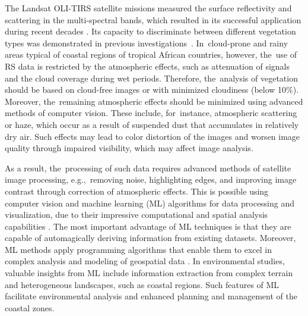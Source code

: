 \documentclass[coasts,article,accept,pdftex,oneauthor]{Definitions/mdpi}
\begin{document}
The Landsat OLI-TIRS satellite missions measured the surface reflectivity and scattering in the multi-spectral bands, {which resulted in its successful application during recent decades} \cite{WULDER2022113195}. Its capacity to discriminate between different vegetation types was demonstrated in previous investigations~\cite{Ferreira,Montfort,Fatoyinbo,Ribeiro}. In~cloud-prone and rainy areas typical of coastal regions of tropical African countries, however, the~use of RS data is restricted by the atmospheric effects, such as attenuation of signals and the cloud coverage during wet periods. {Therefore, the~analysis of vegetation should be based on cloud-free images or with minimized cloudiness (below 10}\%). {Moreover, the~remaining atmospheric effects should be minimized using advanced methods of computer vision. These include, for~instance, atmospheric scattering or haze, which occur as a result of suspended dust that accumulates in relatively dry air. Such effects may lead to color distortion of the images and worsen image quality through impaired visibility, which may affect image analysis. }

As a result, the~processing of such data{ }requires advanced methods of satellite image processing{, e.g.,~removing noise, highlighting edges, and improving image contrast through correction of atmospheric effects. This is possible using} computer vision and machine learning {(ML) } algorithms for data processing and visualization, {due to their impressive computational and spatial analysis capabilities }\cite{LI2023104653,PHAM2023104501,HAN202387}. {The most important advantage of ML techniques is that they are capable of automagically deriving information from  existing datasets. Moreover, ML methods apply programming algorithms that enable them to excel in complex analysis and modeling of geospatial data} \cite{KHAN2022101678}. {In environmental studies, valuable insights from ML include information extraction from complex terrain and heterogeneous landscapes, such as coastal regions. Such features of ML facilitate environmental analysis and enhanced planning and management of the coastal zones.}
\end{document}
